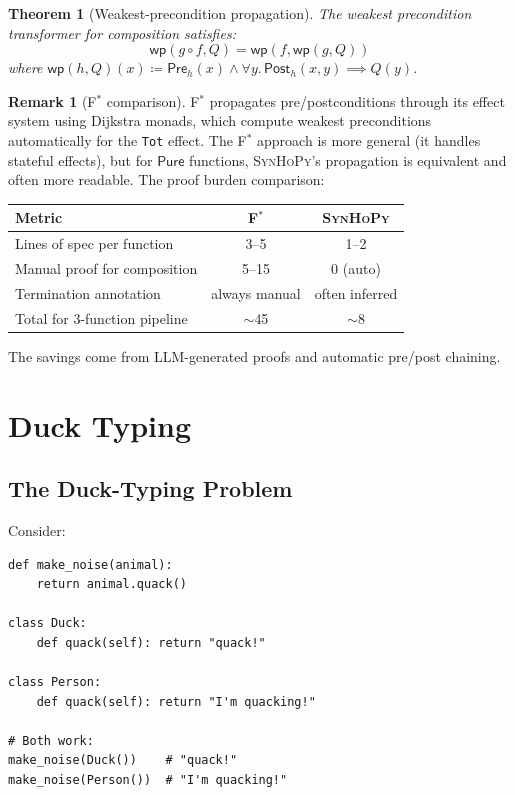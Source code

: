\documentclass[11pt,a4paper]{report}
\theoremstyle{definition}
\newtheorem{remark}[definition]{Remark}
\theoremstyle{plain}
\newtheorem{theorem}[definition]{Theorem}
\newcommand{\defeq}{\coloneqq}
\newcommand{\Pure}{\mathsf{Pure}}
\newcommand{\Pre}{\mathsf{Pre}}
\newcommand{\Post}{\mathsf{Post}}
\renewcommand{\wp}{\mathsf{wp}}
\newcommand{\fstar}{F$^{*}$}
\newcommand{\synhopy}{\textsc{SynHoPy}}
\begin{document}
\begin{theorem}[Weakest-precondition propagation]
\label{thm:wp-prop}
The weakest precondition transformer for composition satisfies:
\[
  \wp(g \circ f, Q) = \wp(f, \wp(g, Q))
\]
where $\wp(h, Q)(x) \defeq \Pre_h(x) \wedge \forall y.\, \Post_h(x, y) \implies Q(y)$.
\end{theorem}

\begin{remark}[\fstar{} comparison]
\fstar{} propagates pre/postconditions through its effect system using Dijkstra
monads, which compute weakest preconditions automatically for the \lstinline[style=fstar]|Tot|
effect. The \fstar{} approach is more general (it handles stateful effects), but
for $\Pure$ functions, \synhopy{}'s propagation is equivalent and often more
readable. The proof burden comparison:
\begin{center}
\begin{tabular}{lcc}
  \toprule
  \textbf{Metric} & \textbf{\fstar{}} & \textbf{\synhopy{}} \\
  \midrule
  Lines of spec per function & 3--5 & 1--2 \\
  Manual proof for composition & 5--15 & 0 (auto) \\
  Termination annotation & always manual & often inferred \\
  Total for 3-function pipeline & $\sim$45 & $\sim$8 \\
  \bottomrule
\end{tabular}
\end{center}
The savings come from LLM-generated proofs and automatic pre/post chaining.
\end{remark}


\chapter{Duck Typing}
\label{ch:duck}

\section{The Duck-Typing Problem}

Consider:
\begin{lstlisting}[style=python]
def make_noise(animal):
    return animal.quack()

class Duck:
    def quack(self): return "quack!"

class Person:
    def quack(self): return "I'm quacking!"

# Both work:
make_noise(Duck())    # "quack!"
make_noise(Person())  # "I'm quacking!"
\end{lstlisting}
\end{document}
